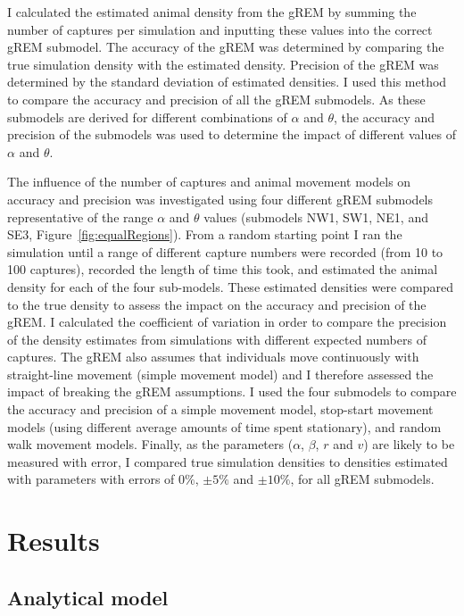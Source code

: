 I calculated the estimated animal density from the gREM by summing the number of captures per simulation and inputting these values into the correct gREM submodel.
The accuracy of the gREM was determined by comparing the true simulation density with the estimated density.
Precision of the gREM was determined by the standard deviation of estimated densities.
I used this method to compare the accuracy and precision of all the gREM submodels.
As these submodels are derived for different combinations of $\alpha$ and $\theta$, the accuracy and precision of the submodels was used to determine the impact of different values of $\alpha$ and $\theta$. 

The influence of the number of captures and animal movement models on accuracy and precision was investigated using four different gREM submodels representative of the range $\alpha$ and $\theta$ values (submodels NW1, SW1, NE1, and SE3, Figure~\ref{fig:equalRegions}).
From a random starting point I ran the simulation until a range of different capture numbers were recorded (from 10 to 100 captures), recorded the length of time this took, and estimated the animal density for each of the four sub-models.
These estimated densities were compared to the true density to assess the impact on the accuracy and precision of the gREM.
I calculated the coefficient of variation in order to compare the precision of the density estimates from simulations with different expected numbers of captures.
The gREM also assumes that individuals move continuously with straight-line movement (simple movement model) and I therefore assessed the impact of breaking the gREM assumptions.
I used the four submodels to compare the accuracy and precision of a simple movement model, stop-start movement models (using different average amounts of time spent stationary), and random walk movement models.
Finally, as the parameters ($\alpha$, $\beta$, $r$ and $v$) are likely to be measured with error, I compared true simulation densities to densities estimated with parameters with errors of $0\%$, $\pm 5\%$ and $\pm 10\%$, for all gREM submodels.


\section{Results}

\subsection{Analytical model}

